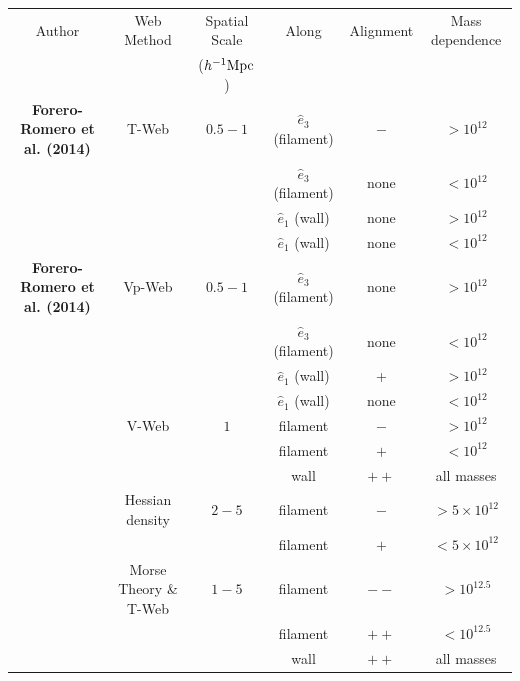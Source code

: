 \documentclass[useAMS,usenatbib]{mn2e}
\newcommand{\hMpc}{{\ifmmode{h^{-1}{\rm Mpc}}\else{$h^{-1}$Mpc }\fi}}
\newcommand{\hMsun}{{\ifmmode{h^{-1}{\rm
        {M_{\odot}}}}\else{$h^{-1}{\rm{M_{\odot}}}$~}\fi}}
\begin{document}
\begin{table}
\begin{tabular}{cccccc}\hline\hline
Author & Web Method & Spatial Scale& Along &
Alignment & Mass dependence\\
 & & ($\hMpc$)& & & \\\hline

{\bf Forero-Romero et al. (2014)} & T-Web & $0.5-1$ &
$\hat{e}_3$  (filament) & $-$ & $>10^{12}$\hMsun\\

&   & &
$\hat{e}_3$  (filament) & none & $<10^{12}$\hMsun\\

&   & &
$\hat{e}_1$ (wall) & none & $>10^{12}$\hMsun\\

&   & &
$\hat{e}_1$ (wall) & none & $<10^{12}$\hMsun\\\hline

{\bf Forero-Romero et al. (2014)} & Vp-Web & $0.5-1$ &
$\hat{e}_3$  (filament) & none & $>10^{12}$\hMsun\\

&   & &
$\hat{e}_3$ (filament) & none & $<10^{12}$\hMsun\\

&   & &
$\hat{e}_1$ (wall) & + & $>10^{12}$\hMsun\\

&   & &
$\hat{e}_1$ (wall) & none & $<10^{12}$\hMsun\\\hline

\cite{Libeskind2013} & V-Web & $1$ &
filament &$-$ & $>10^{12}$\hMsun\\

&   & &
filament &$+$ & $<10^{12}$\hMsun\\

&   & &
wall & $++$ & all masses\\\hline

\cite{Trowland2013} & Hessian density & $2-5$ &
filament & $-$ & $> 5\times 10^{12}$\hMsun\\
&   & &
filament & $+$ & $< 5\times 10^{12}$\hMsun\\\hline

\cite{Codis2012} & Morse Theory \& T-Web & $1-5$ &
filament & $--$ & $>10^{12.5}$\hMsun \\

&   & &
filament & $++$ & $<10^{12.5}$\hMsun \\

& & &
wall & $++$ & all masses\\\hline


\end{tabular}
\end{table}
\end{document}
